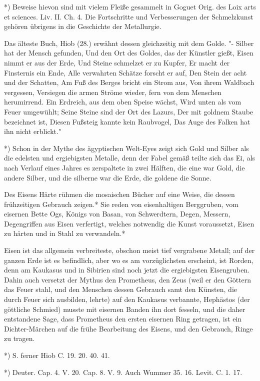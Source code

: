\documentclass[a4paper, 11pt, oneside, polutonikogreek, german]{article}
\begin{document}
*) Beweise hievon sind mit vielem Fleiße gesammelt in Goguet Orig. des Loix arts et sciences. Liv. II. Ch. 4. Die Fortschritte und Verbesserungen der Schmelzkunst gehören übrigens in die Geschichte der Metallurgie.

Das älteste Buch, Hiob (28.) erwähnt dessen gleichzeitig mit dem Golde. "- Silber hat der Mensch gefunden, Und den Ort des Goldes, das der Künstler gießt, Eisen nimmt er aus der Erde, Und Steine schmelzet er zu Kupfer, Er macht der Finsternis ein Ende, Alle verwahrten Schätze forscht er auf, Den Stein der acht und der Schatten, Am Fuß des Berges bricht ein Strom aus, Von ihrem Waldbach vergessen, Versiegen die armen Ströme wieder, fern von dem Menschen herumirrend. Ein Erdreich, aus dem oben Speise wächst, Wird unten als vom Feuer umgewühlt; Seine Steine sind der Ort des Lazurs, Der mit goldnem Staube bezeichnet ist, Diesen Fußsteig kannte kein Raubvogel, Das Auge des Falken hat ihn nicht erblickt."

*) Schon in der Mythe des ägyptischen Welt-Eyes zeigt sich Gold und Silber als die edelsten und ergiebigsten Metalle, denn der Fabel gemäß teilte sich das Ei, als nach Verlauf eines Jahres es zerspaltete in zwei Hälften, die eine war Gold, die andere Silber, und die silberne war die Erde, die goldene die Sonne.

Des Eisens Härte rühmen die mosaischen Bücher auf eine Weise, die dessen frühzeitigen Gebrauch zeigen.* Sie reden von eisenhaltigen Berggruben, vom eisernen Bette Ogs, Königs von Basan, von Schwerdtern, Degen, Messern, Degengriffen aus Eisen verfertigt, welches notwendig die Kunst voraussetzt, Eisen zu härten und in Stahl zu verwandeln.*

Eisen ist das allgemein verbreiteste, obschon meist tief vergrabene Metall; auf der ganzen Erde ist es befindlich, aber wo es am vorzüglichsten erscheint, ist Rorden, denn am Kaukasus und in Sibirien sind noch jetzt die ergiebigsten Eisengruben. Dahin auch versetzt der Mythus den Prometheus, den Zeus (weil er den Göttern das Feuer stahl, und den Menschen dessen Gebrauch samt den Künsten, die durch Feuer sich ausbilden, lehrte) auf den Kaukasus verbannte, Hephästos (der göttliche Schmied) musste mit eisernen Banden ihn dort fesseln, und die daher entstandene Sage, dass Prometheus den ersten eisernen Ring getragen, ist ein Dichter-Märchen auf die frühe Bearbeitung des Eisens, und den Gebrauch, Ringe zu tragen.

*) S. ferner Hiob C. 19. 20. 40. 41.

*) Deuter. Cap. 4. V. 20. Cap. 8. V. 9. Auch Wummer 35. 16. Levit. C. 1. 17.
\end{document}
